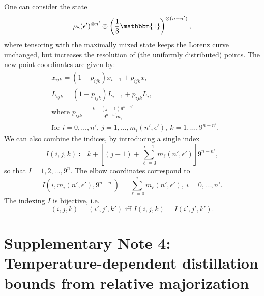 \documentclass[
twocolumn,
superscriptaddress
]{revtex4-1}
\def\id{\mathbbm{1}}
\begin{document}
One can consider the state 
\begin{equation*}
\rho_{\rm{S}}(\epsilon')^{\otimes n'} \otimes \left( \frac{1}{3}\id \right)^{\otimes (n-n')},
\end{equation*}
where tensoring with the maximally mixed state keeps the Lorenz curve unchanged, but increases the resolution of (the uniformly distributed) points.
The new point coordinates are given by:
\begin{align}
    &x_{ijk} = \left( 1-p_{ijk}\right) x_{i-1} + p_{ijk} x_{i} \label{eq:lcsu_xcoord}\\
    &L_{ijk} = \left( 1-p_{ijk} \right) L_{i-1} + p_{ijk} L_{i}, \label{eq:lcsu_lcoord}\\
    &\text{where } p_{ijk} = \frac{k + (j-1)9^{n-n'}}{9^{n-n'} m_{i}} \nonumber\\
    &\text{for } i=0,\dots,n',\ j = 1,\dots,m_{i}(n', \epsilon'),\ k = 1,\dots,9^{n-n'}. \nonumber
\end{align}
We can also combine the indices, by introducing a single index
\begin{equation}
    I(i,j,k) \coloneqq k + \left[ (j-1) + \sum_{\ell=0}^{i-1} m_{\ell}(n', \epsilon') \right]9^{n-n'},
\end{equation}
so that $I=1,2,\dots, 9^{n}$.
The elbow coordinates correspond to 
\begin{equation}
	I(i, m_{i}(n', \epsilon'), 9^{n-n'}) = \sum_{\ell=0}^{i} m_{\ell}(n', \epsilon'),\ i= 0,\dots,n'.
\end{equation}
The indexing $I$ is bijective, i.e.
\begin{equation}
	(i,j,k) = (i',j',k') \text{ iff } I(i,j,k) = I(i',j',k').
\end{equation}

\section*{Supplementary Note 4: Temperature-dependent distillation bounds from relative majorization}
\end{document}
